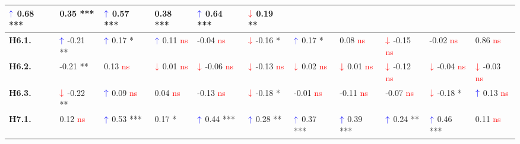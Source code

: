 \begin{table*}
{\begin{tabular}{|l|ll|ll|ll|ll|ll|}
  \multicolumn{1}{l|}{$\textcolor{blue}{\uparrow}$ 0.68 ***} &
  0.35 *** &
  \multicolumn{1}{l|}{$\textcolor{blue}{\uparrow}$ 0.57 ***} &
  0.38 *** &
  \multicolumn{1}{l|}{$\textcolor{blue}{\uparrow}$ 0.64 ***} &
  $\textcolor{red}{\downarrow}$ 0.19 ** \\ \hline
\textbf{H6.1.} &
  \multicolumn{1}{l|}{$\textcolor{blue}{\uparrow}$ -0.21 **} &
  $\textcolor{blue}{\uparrow}$ 0.17 * &
  \multicolumn{1}{l|}{$\textcolor{blue}{\uparrow}$ 0.11 \textcolor{red}{ns}} &
  -0.04 \textcolor{red}{ns} &
  \multicolumn{1}{l|}{$\textcolor{red}{\downarrow}$ -0.16 *} &
  $\textcolor{blue}{\uparrow}$ 0.17 * &
  \multicolumn{1}{l|}{0.08 \textcolor{red}{ns}} &
  $\textcolor{red}{\downarrow}$ -0.15 \textcolor{red}{ns} &
  \multicolumn{1}{l|}{-0.02 \textcolor{red}{ns}} &
  0.86 \textcolor{red}{ns} \\ \hline
\textbf{H6.2.} &
  \multicolumn{1}{l|}{-0.21 **} &
  0.13 \textcolor{red}{ns} &
  \multicolumn{1}{l|}{$\textcolor{red}{\downarrow}$ 0.01 \textcolor{red}{ns}} &
  $\textcolor{red}{\downarrow}$ -0.06 \textcolor{red}{ns} &
  \multicolumn{1}{l|}{$\textcolor{red}{\downarrow}$ -0.13 \textcolor{red}{ns}} &
  $\textcolor{red}{\downarrow}$ 0.02 \textcolor{red}{ns} &
  \multicolumn{1}{l|}{$\textcolor{red}{\downarrow}$ 0.01 \textcolor{red}{ns}} &
  $\textcolor{red}{\downarrow}$ -0.12 \textcolor{red}{ns} &
  \multicolumn{1}{l|}{$\textcolor{red}{\downarrow}$ -0.04 \textcolor{red}{ns}} &
  $\textcolor{red}{\downarrow}$ -0.03 \textcolor{red}{ns} \\ \hline
\textbf{H6.3.} &
  \multicolumn{1}{l|}{$\textcolor{red}{\downarrow}$ -0.22 **} &
  $\textcolor{blue}{\uparrow}$ 0.09 \textcolor{red}{ns} &
  \multicolumn{1}{l|}{0.04 \textcolor{red}{ns}} &
  -0.13 \textcolor{red}{ns} &
  \multicolumn{1}{l|}{$\textcolor{red}{\downarrow}$ -0.18 *} &
  -0.01 \textcolor{red}{ns} &
  \multicolumn{1}{l|}{-0.11 \textcolor{red}{ns}} &
  -0.07 \textcolor{red}{ns} &
  \multicolumn{1}{l|}{$\textcolor{red}{\downarrow}$ -0.18 *} &
  $\textcolor{blue}{\uparrow}$ 0.13 \textcolor{red}{ns} \\ \hline
\textbf{H7.1.} &
  \multicolumn{1}{l|}{0.12 \textcolor{red}{ns}} &
  $\textcolor{blue}{\uparrow}$ 0.53 *** &
  \multicolumn{1}{l|}{0.17 *} &
  $\textcolor{blue}{\uparrow}$ 0.44 *** &
  \multicolumn{1}{l|}{$\textcolor{blue}{\uparrow}$ 0.28 **} &
  $\textcolor{blue}{\uparrow}$ 0.37 *** &
  \multicolumn{1}{l|}{$\textcolor{blue}{\uparrow}$ 0.39 ***} &
  $\textcolor{blue}{\uparrow}$ 0.24 ** &
  \multicolumn{1}{l|}{$\textcolor{blue}{\uparrow}$ 0.46 ***} &
  0.11 \textcolor{red}{ns} \\ \hline

\end{tabular}}
\end{table*}
